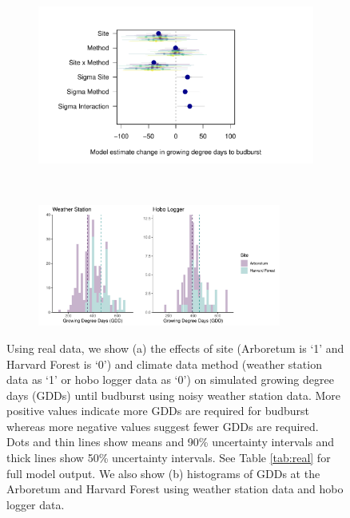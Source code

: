 \documentclass{article}\usepackage[]{graphicx}\usepackage[]{color}
\begin{document}
\begin{figure}[H]
  \begin{subfigure}{.5\linewidth}
    \caption{}
    \centering
    \includegraphics[height=7cm, width=11cm]{..//analyses/figures/muplot_urban_real.pdf}
    \label{fig:muplotreal}
  \end{subfigure}%
    \begin{subfigure}{.5\linewidth}
      \caption{}
      \centering
      \includegraphics[height=4cm, width=8cm]{..//analyses/figures/gdd_methods_real.pdf}
    \label{fig:gddreal}
  \end{subfigure}
\caption{ Using real data, we show (a) the effects of site (Arboretum is `1' and Harvard Forest is `0') and climate data method (weather station data as `1' or hobo logger data as `0') on simulated growing degree days (GDDs) until budburst using noisy weather station data. More positive values indicate more GDDs are required for budburst whereas more negative values suggest fewer GDDs are required. Dots and thin lines show means and 90\% uncertainty intervals and thick lines show 50\% uncertainty intervals. See Table \ref{tab:real} for full model output. We also show (b) histograms of GDDs at the Arboretum and Harvard Forest using weather station data and hobo logger data.}
\label{fig:real}
\end{figure}
\end{document}
